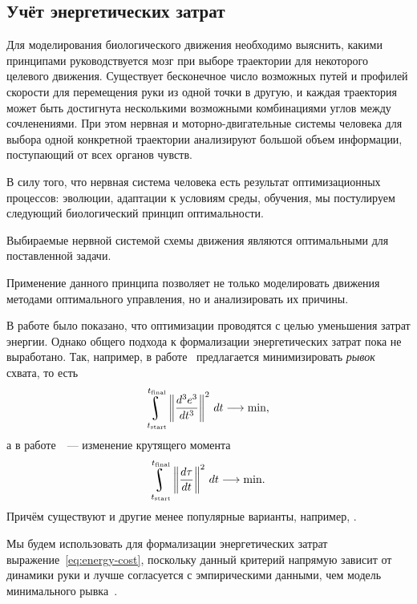 \documentclass[../../doc.tex]{subfiles}
\begin{document}
    \subsection{Учёт энергетических затрат}

    Для моделирования биологического движения необходимо выяснить, какими принципами руководствуется мозг при выборе траектории для некоторого целевого движения.
    Существует бесконечное число возможных путей и профилей скорости для перемещения руки из одной точки в другую,
    и каждая траектория может быть достигнута несколькими возможными комбинациями углов между сочленениями.
    При этом нервная и моторно-двигательные системы человека для выбора одной конкретной траектории анализируют большой объем информации, поступающий от всех органов чувств.

    В силу того, что нервная система человека есть результат оптимизационных процессов:
    эволюции, адаптации к условиям среды, обучения,
    мы постулируем следующий биологический принцип оптимальности.
    
    \begin{assertion}
        Выбираемые нервной системой схемы движения являются оптимальными для поставленной задачи.
    \end{assertion}
    
    Применение данного принципа позволяет не только моделировать движения методами оптимального управления, но и анализировать их причины.

    В работе \cite{todorov2002} было показано, что оптимизации проводятся с целью уменьшения затрат энергии.
    Однако общего подхода к формализации энергетических затрат пока не выработано.
    Так, например, в работе~\cite{hogan1984} предлагается минимизировать \textit{рывок} схвата, то есть
    $$
        \uint\limits_{t_{\textnormal{start}}}^{t_{\textnormal{final}}}\left\|
            \frac{d^3e^3}{dt^3}
        \right\|^2\, dt \longrightarrow \textnormal{min},
    $$
    а в работе~\cite{uno1989}~--- изменение крутящего момента
    \begin{equation}\label{eq:energy-cost}
        \uint\limits_{t_{\textnormal{start}}}^{t_{\textnormal{final}}}\left\|
            \frac{d\tau}{dt}
        \right\|^2\, dt \longrightarrow \textnormal{min}.
    \end{equation}
    Причём существуют и другие менее популярные варианты, например, \cite{harris1998}.
    
    Мы будем использовать для формализации энергетических затрат выражение~\eqref{eq:energy-cost},
    поскольку данный критерий напрямую зависит от динамики руки и лучше согласуется с эмпирическими данными,
    чем модель минимального рывка~\cite{breteler2002}.
    
    \ifSubfilesClassLoaded{
        \nocite{*}
        \clearpage
        
        
    }{}
\end{document}
